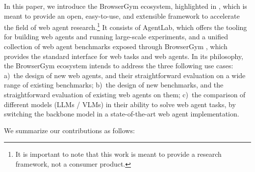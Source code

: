 \documentclass[10pt]{article} %
\begin{document}
In this paper, we introduce the BrowserGym ecosystem, highlighted in , which is meant to provide an open, easy-to-use, and extensible framework to accelerate the field of web agent research.\footnote{It is important to note that this work is meant to provide a research framework, not a consumer product.} It consists of AgentLab, which offers the tooling for building web agents and running large-scale experiments, and a unified collection of web agent benchmarks exposed through BrowserGym \citep{workarena}, which provides the standard interface for web tasks and web agents. In its philosophy, the BrowserGym ecosystem intends to address the three following use cases: a)~the design of new web agents, and their straightforward evaluation on a wide range of existing benchmarks; b)~the design of new benchmarks, and the straightforward evaluation of existing web agents on them; c)~the comparison of different models (LLMs / VLMs) in their ability to solve web agent tasks, by switching the backbone model in a state-of-the-art web agent implementation. 

We summarize our contributions as follows:
\end{document}
